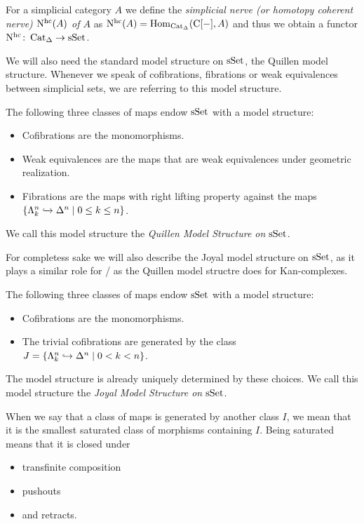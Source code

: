 \begin{definition} %
    For a simplicial category $A$ we define the \emph{simplicial nerve (or homotopy coherent nerve) $\operatorname{N^{hc}}(A)$ of $A$} as $\operatorname{N^{hc}}(A)=\operatorname{Hom}_{\operatorname{Cat}_{\Delta}}(\operatorname{C}[-],A)$ and thus we obtain a functor $\operatorname{N^{hc}}\colon\operatorname{Cat}_{\Delta}\to\operatorname{sSet}$.
\end{definition}
We will also need the standard model structure on $\operatorname{sSet}$, the Quillen model structure. 
Whenever we speak of cofibrations, fibrations or weak equivalences between simplicial sets, we are referring to this model structure.
\begin{prop}
    The following three classes of maps endow $\operatorname{sSet}$ with a model structure:
    \begin{itemize}
        \item Cofibrations are the monomorphisms.
        \item Weak equivalences are the maps that are weak equivalences under geometric realization. %
        \item Fibrations are the maps with right lifting property against the maps $\left\lbrace\Lambda_k^n\xhookrightarrow{}\Delta^n\mid 0\leq k\leq n\right\rbrace$.
    \end{itemize}
    We call this model structure the \emph{Quillen Model Structure on $\operatorname{sSet}$}.
\end{prop}
For completess sake we will also describe the Joyal model structure on $\operatorname{sSet}$, as it plays a similar role for \inftycats/ as the Quillen model structre does for Kan-complexes.
\begin{prop}
    The following three classes of maps endow $\operatorname{sSet}$ with a model structure:
    \begin{itemize}
        \item Cofibrations are the monomorphisms.
        \item The trivial cofibrations are generated by the class $J=\left\lbrace\Lambda_k^n\hookrightarrow\Delta^n\mid 0< k< n\right\rbrace$.
    \end{itemize}
    The model structure is already uniquely determined by these choices.
    We call this model structure the \emph{Joyal Model Structure on $\operatorname{sSet}$}.
\end{prop}
\begin{remark}
    When we say that a class of maps is generated by another class $I$, we mean that it is the smallest saturated class of morphisms containing $I$.
    Being saturated means that it is closed under
    \begin{itemize}
        \item transfinite composition
        \item pushouts
        \item and retracts.
    \end{itemize}
\end{remark}
